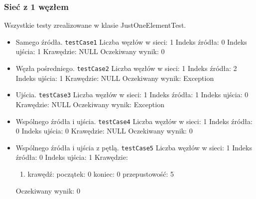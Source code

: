 \subsubsection{Sieć z 1 węzłem}
Wszystkie testy zrealizowane w klasie JustOneElementTest.
\begin{itemize}[nosep]
    \item Samego źródła.
    \texttt{testCase1}
    Liczba węzłów w sieci: 1
    Indeks źródła: 0
    Indeks ujścia: 1
    Krawędzie: NULL
    Oczekiwany wynik: 0

    \item Węzła pośredniego.
    \texttt{testCase2}
    Liczba węzłów w sieci: 1
    Indeks źródła: 2
    Indeks ujścia: 1
    Krawędzie: NULL
    Oczekiwany wynik: Exception

    \item Ujścia.
    \texttt{testCase3}
    Liczba węzłów w sieci: 1
    Indeks źródła: 1
    Indeks ujścia: 0
    Krawędzie: NULL
    Oczekiwany wynik: Exception

    \item Wspólnego źródła i ujścia.
    \texttt{testCase4}
    Liczba węzłów w sieci: 1
    Indeks źródła: 0
    Indeks ujścia: 0
    Krawędzie: NULL
    Oczekiwany wynik: 0

    \item Wspólnego źródła i ujścia z pętlą.
    \texttt{testCase5}
    Liczba węzłów w sieci: 1
    Indeks źródła: 0
    Indeks ujścia: 1
    Krawędzie:
    \begin{enumerate}[nosep]
        \item krawędź:
        początek: 0
        koniec: 0
        przepustowość: 5
    \end{enumerate}
    Oczekiwany wynik: 0

\end{itemize}



